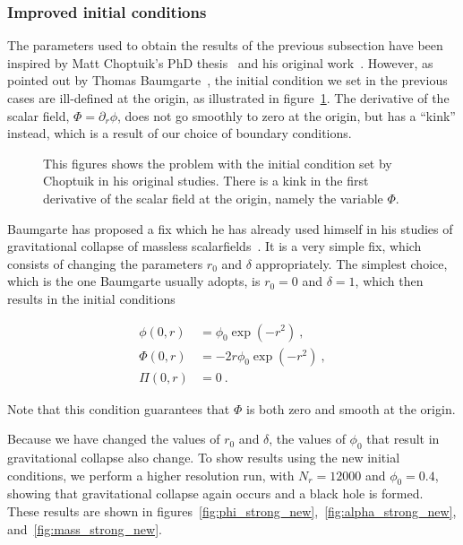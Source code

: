 \documentclass[a4paper,11pt]{article}
\renewcommand{\d}{\delta}
\newcommand{\pd}{\partial}
\newcommand{\lrpar}[1]{\left( #1 \right)}
\newcommand{\n}{\noindent}
\newcommand{\eq}[1]{
  \begin{equation}
    #1
  \end{equation}
}
\newcommand{\spl}[1]{
  \begin{split}
    #1
  \end{split}
}
\begin{document}
\subsubsection{Improved initial conditions}

The parameters used to obtain the results of the previous subsection have been inspired by Matt Choptuik's PhD thesis~\cite{Choptuik_1986} and his original work~\cite{PhysRevLett.70.9}. However, as pointed out by Thomas Baumgarte~\cite{Baumgarte_private}, the initial condition we set in the previous cases are ill-defined at the origin, as illustrated in figure~\ref{fig:origin_problem}. The derivative of the scalar field, $\Phi=\pd_{r}\phi$, does not go smoothly to zero at the origin, but has a ``kink'' instead, which is a result of our choice of boundary conditions.

\begin{figure}[ht]
  \centering
  
  \caption[Problem with the initial condition at the origin.]{This figures shows the problem with the initial condition set by Choptuik in his original studies. There is a kink in the first derivative of the scalar field at the origin, namely the variable $\Phi$.}
  \label{fig:origin_problem}
\end{figure}

Baumgarte has proposed a fix which he has already used himself in his studies of gravitational collapse of massless scalarfields~\cite{Baumgarte_2018}. It is a very simple fix, which consists of changing the parameters $r_{0}$ and $\delta$ appropriately. The simplest choice, which is the one Baumgarte usually adopts, is $r_{0}=0$ and $\d=1$, which then results in the initial conditions

\eq{
  \spl{
    \phi(0,r) &= \phi_{0}\exp\lrpar{-r^{2}}\ ,\\
    \Phi(0,r) &= -2r\phi_{0}\exp\lrpar{-r^{2}}\ ,\\
    \Pi(0,r) &= 0\ .
  }
  \label{eq:initial_condition_new}
}

\n Note that this condition guarantees that $\Phi$ is both zero and smooth at the origin.

Because we have changed the values of $r_{0}$ and $\d$, the values of $\phi_{0}$ that result in gravitational collapse also change. To show results using the new initial conditions, we perform a higher resolution run, with $N_{r}=12000$ and $\phi_{0}=0.4$, showing that gravitational collapse again occurs and a black hole is formed. These results are shown in figures~\ref{fig:phi_strong_new},~\ref{fig:alpha_strong_new}, and~\ref{fig:mass_strong_new}.
\end{document}
